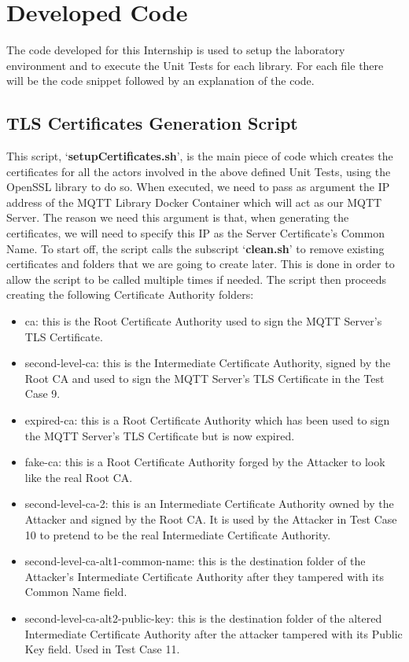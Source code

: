 \documentclass[binding=0.6cm,noexaminfo]{sapthesis}
\begin{document}
\chapter{Developed Code}
The code developed for this Internship is used to setup the laboratory environment and to execute the Unit Tests for each library. For each file there will be the code snippet followed by an explanation of the code.

\section{TLS Certificates Generation Script}

This script, `\textbf{setupCertificates.sh}', is the main piece of code which creates the certificates for all the actors involved in the above defined Unit Tests, using the OpenSSL library to do so. When executed, we need to pass as argument the IP address of the  MQTT Library Docker Container which will act as our MQTT Server. The reason we need this argument is that, when generating the certificates, we will need to specify this IP as the Server Certificate’s Common Name.
To start off, the script calls the subscript `\textbf{clean.sh}' to remove existing certificates and folders that we are going to create later. This is done in order to allow the script to be called multiple times if needed. The script then proceeds creating the following Certificate Authority folders:
\begin{itemize}
	\item ca: this is the Root Certificate Authority used to sign the MQTT Server’s TLS Certificate.
	\item second-level-ca: this is the Intermediate Certificate Authority, signed by the  Root CA and used to sign the MQTT Server’s TLS Certificate in the Test Case 9.
	\item expired-ca: this is a Root Certificate Authority which has been used to sign the MQTT Server’s TLS Certificate but is now expired.
	\item fake-ca: this is a Root Certificate Authority forged by the Attacker to look like the real Root CA.
	\item second-level-ca-2: this is an Intermediate Certificate Authority owned by the Attacker and signed by the Root CA. It is used by the Attacker in Test Case 10  to pretend to be the real Intermediate Certificate Authority.
	\item second-level-ca-alt1-common-name: this is the destination folder of the Attacker’s Intermediate Certificate Authority after they tampered with its Common Name field.
	\item second-level-ca-alt2-public-key: this is the destination folder of the altered  Intermediate Certificate Authority after the attacker tampered with its Public Key field. Used in Test Case 11.
\end{itemize}
\end{document}
